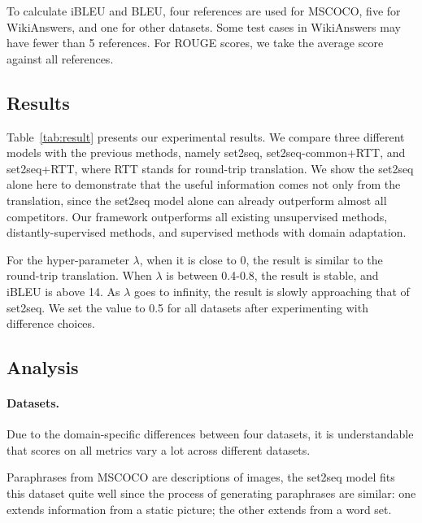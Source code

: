 To calculate iBLEU and BLEU, four references are used for MSCOCO, 
five for WikiAnswers, and one for other datasets. Some test cases in 
WikiAnswers may have fewer than 5 references. 
For ROUGE scores, we take the average score against all references.

\subsection{Results} \label{sec:result}

Table~\ref{tab:result} presents our experimental results. We compare three different models with the previous methods, 
namely set2seq, set2seq-common+RTT, and set2seq+RTT, where RTT stands for 
round-trip translation. We show the set2seq alone here to demonstrate that
the useful information comes not only from the translation, since the
set2seq model alone can already outperform almost all competitors. 
Our framework outperforms all existing unsupervised methods, 
distantly-supervised methods, and supervised methods with domain adaptation.

For the hyper-parameter $\lambda$, when it is close to 0, the result is similar to the
round-trip translation. When $\lambda$ is between 0.4-0.8, the result
is stable, and iBLEU is above 14. As $\lambda$ goes to infinity, the
result is slowly approaching that of set2seq. We set the value to 0.5 for all datasets after experimenting with difference
choices.

\subsection{Analysis} \label{sec:analysis}
\paragraph{Datasets. } Due to the domain-specific differences between four datasets, it is understandable that scores on all metrics vary a lot across different datasets. 

Paraphrases from MSCOCO are descriptions of images, the set2seq model fits this dataset quite well since the process of generating paraphrases are similar: 
one extends information from a static picture; 
the other extends from a word set. 

